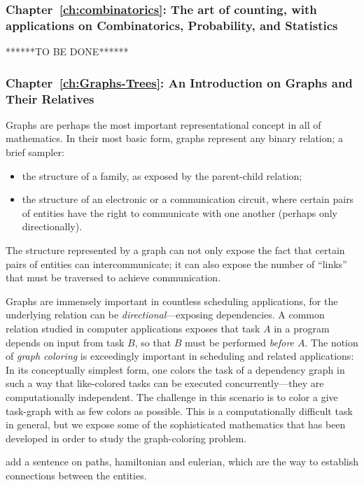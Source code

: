 \subsubsection{Chapter~\ref{ch:combinatorics}: 
The art of counting, with applications on
Combinatorics,
  Probability, and Statistics}

******TO BE DONE******

\subsubsection{Chapter~\ref{ch:Graphs-Trees}: An Introduction on Graphs and Their Relatives}

Graphs are perhaps the most important representational concept in all
of mathematics.  In their most basic form, graphs represent any binary
relation; a brief sampler:
\begin{itemize}
\item
the structure of a family, as exposed by the parent-child relation;
\item
the structure of an electronic or a communication circuit, where
certain pairs of entities have the right to communicate with one
another (perhaps only directionally).
\end{itemize}
The structure represented by a graph can not only expose the fact that
certain pairs of entities can intercommunicate; it can also expose the
number of ``links'' that must be traversed to achieve communication.

Graphs are immensely important in countless scheduling applications,
for the underlying relation can be {\em directional}---exposing
dependencies.  A common relation studied in computer applications
exposes that task $A$ in a program depends on input from task $B$, so
that $B$ must be performed {\em before $A$}.  The notion of {\it graph
  coloring} is exceedingly important in scheduling and related
applications: In its conceptually simplest form, one colors the task
of a dependency graph in such a way that like-colored tasks can be
executed concurrently---they are computationally independent.  The
challenge in this scenario is to color a give task-graph with as few
colors as possible.  This is a computationally difficult task in
general, but we expose some of the sophisticated mathematics that has
been developed in order to study the graph-coloring problem.

{\Denis add a sentence on paths, hamiltonian and eulerian, 
which are the way to establish connections
between the entities.}

